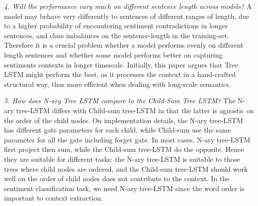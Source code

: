     \textit{4. Will the performance vary much on different sentence length across models?}
    A model may behave very differently to sentences of different ranges of
    length, due to a higher probability of encountering sentiment contradictions
    in longer sentences, and class imbalances on the sentence-length in the
    training-set.  Therefore it is a crucial problem whether a model performs
    evenly on different length sentences and whether some model performs better
    on capturing sentiments contexts in longer timescale. Initially, this paper
    argues that Tree LSTM might perform the best, as it processes the context in
    a hand-crafted structural way, thus more efficient when dealing with
    long-scale semantics.

    \textit{5. How does N-ary Tree LSTM compare to the Child-Sum Tree LSTM?}
    The N-ary tree-LSTM differs with Child-sum tree-LSTM in that the latter is
    agnostic on the order of the child nodes. On implementation details, the
    N-ary tree-LSTM has different gate parameters for each child, while
    Child-sum use the same parameter for all the gate including forget gate. In
    most cases, N-ary tree-LSTM first project then sum, while the Child-sum
    tree-LSTM do the opposite. Hence they are suitable for different tasks: the
    N-ary tree-LSTM is suitable to those trees where child nodes are ordered,
    and the Child-sum tree-LSTM should work well on the order of child nodes
    does not contribute to the context. In the sentiment classification task, we
    need N-ary tree-LSTM since the word order is important to context
    extraction.
